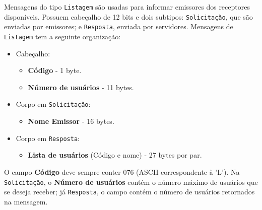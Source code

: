 \documentclass[12pt]{article}
\begin{document}
Mensagens do tipo {\tt Listagem} são usadas para informar emissores dos receptores disponíveis.
Possuem cabeçalho de 12 bits e dois subtipos:
{\tt Solicitação}, que são enviadas por emissores;
e {\tt Resposta}, enviada por servidores.
Mensagens de {\tt Listagem} tem a seguinte organização:
\begin{itemize}
\item Cabeçalho:
	\begin{itemize}
	\item {\bf Código} - 1 byte.
	\item {\bf Número de usuários} - 11 bytes.
	\end{itemize}
\item Corpo em {\tt Solicitação}:
	\begin{itemize}
	\item {\bf Nome Emissor} - 16 bytes.
	\end{itemize}
\item Corpo em {\tt Resposta}:
	\begin{itemize}
	\item {\bf Lista de usuários} (Código e nome) - 27 bytes por par.
	\end{itemize}
\end{itemize}
O campo {\bf Código} deve sempre conter 076 (ASCII correspondente à 'L').
Na {\tt Solicitação}, o {\bf Número de usuários} contém o número máximo de usuários que se deseja receber;
já {\tt Resposta}, o campo contém o número de usuários retornados na mensagem.
\end{document}
